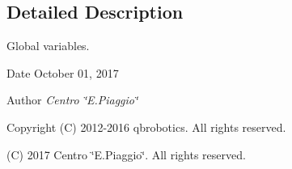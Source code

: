 \subsection{Detailed Description}
Global variables. 

\begin{DoxyDate}{Date}
October 01, 2017 
\end{DoxyDate}
\begin{DoxyAuthor}{Author}
{\itshape Centro \char`\"{}\+E.\+Piaggio\char`\"{}} 
\end{DoxyAuthor}
\begin{DoxyCopyright}{Copyright}
(C) 2012-\/2016 qbrobotics. All rights reserved. 

(C) 2017 Centro \char`\"{}\+E.\+Piaggio\char`\"{}. All rights reserved. 
\end{DoxyCopyright}
